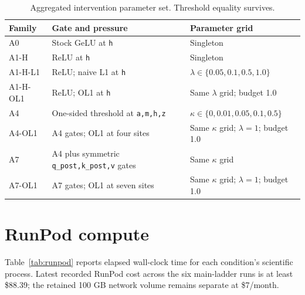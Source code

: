 \documentclass[10pt,a4paper]{article}
\newcommand{\code}[1]{\texttt{#1}}
\begin{document}
{\begin{table}[htbp]
\centering
\caption{Aggregated intervention parameter set. Threshold equality survives.}
\label{tab:parameters}
\begin{tabularx}{\textwidth}{@{}p{20mm}p{68mm}Y@{}}
\toprule
\textbf{Family} & \textbf{Gate and pressure} & \textbf{Parameter grid} \\
\midrule
A0 & Stock GeLU at \code{h} & Singleton \\
A1-H & ReLU at \code{h} & Singleton \\
A1-H-L1 & ReLU; naive L1 at \code{h} & $\lambda\in\{0.05,0.1,0.5,1.0\}$ \\
A1-H-OL1 & ReLU; OL1 at \code{h} & Same $\lambda$ grid; budget 1.0 \\
A4 & One-sided threshold at \code{a,m,h,z} & $\kappa\in\{0,0.01,0.05,0.1,0.5\}$ \\
A4-OL1 & A4 gates; OL1 at four sites & Same $\kappa$ grid; $\lambda=1$; budget 1.0 \\
A7 & A4 plus symmetric \code{q\_post,k\_post,v} gates & Same $\kappa$ grid \\
A7-OL1 & A7 gates; OL1 at seven sites & Same $\kappa$ grid; $\lambda=1$; budget 1.0 \\
\bottomrule
\end{tabularx}
\end{table}}

\section{RunPod compute}

Table~\ref{tab:runpod} reports elapsed wall-clock time for each condition's scientific process. Latest recorded RunPod cost across the six main-ladder runs is at least \$88.39; the retained 100 GB network volume remains separate at \$7/month.
\end{document}
